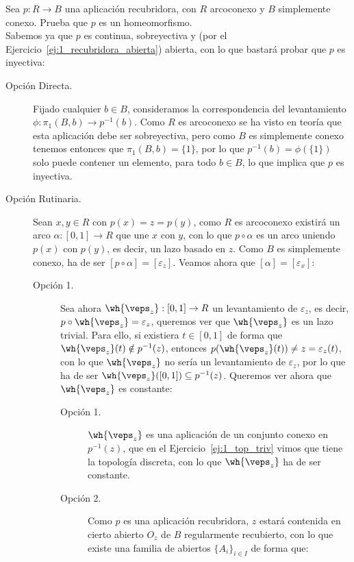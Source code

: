 \begin{ejercicio}\label{ej:10_rel2}
   Sea $p:R\to B$ una aplicación recubridora, con $R$ arcoconexo y $B$ simplemente conexo. Prueba que $p$ es un homeomorfismo.\\

   \noindent
   Sabemos ya que $p$ es continua, sobreyectiva y (por el Ejercicio~\ref{ej:1_recubridora_abierta}) abierta, con lo que bastará probar que $p$ es inyectiva:
   \begin{description}
       \item [Opción Directa.] Fijado cualquier $b\in B$, consideramos la correspondencia del levantamiento $\phi:\pi_1(B,b)\to p^{-1}(b)$. Como $R$ es arcoconexo se ha visto en teoría que esta aplicación debe ser sobreyectiva, pero como $B$ es simplemente conexo tenemos entonces que $\pi_1(B,b) = \{1\}$, por lo que $p^{-1}(b)=\phi(\{1\})$ solo puede contener un elemento, para todo $b\in B$, lo que implica que $p$ es inyectiva.
       \item [Opción Rutinaria.] Sean $x,y\in R$ con $p(x) = z = p(y)$, como $R$ es arcoconexo existirá un arco $\alpha:[0,1]\to R$ que une $x$ con $y$, con lo que $p\circ \alpha$ es un arco uniendo $p(x)$ con $p(y)$, es decir, un lazo basado en $z$. Como $B$ es simplemente conexo, ha de ser $[p\circ \alpha] = [\varepsilon_z]$. Veamos ahora que $[\alpha] = [\varepsilon_x]$:
       \begin{description}
            \item[Opción 1.] Sea ahora $\wh{\veps_z}:[0,1]\to R$ un levantamiento de $\varepsilon_z$, es decir, $p\circ \wh{\veps_z} = \varepsilon_z$, queremos ver que $\wh{\veps_z}$ es un lazo trivial. Para ello, si existiera $t\in [0,1]$ de forma que $\wh{\veps_z}(t)\notin p^{-1}(z)$, entonces $p(\wh{\veps_z}(t)) \neq z = \varepsilon_z(t)$, con lo que $\wh{\veps_z}$ no sería un levantamiento de $\varepsilon_z$, por lo que ha de ser $\wh{\veps_z}([0,1])\subseteq p^{-1}(z)$. Queremos ver ahora que $\wh{\veps_z}$ es constante:
            \begin{description}
                \item [Opción 1.] $\wh{\veps_z}$ es una aplicación de un conjunto conexo en $p^{-1}(z)$, que en el Ejercicio~\ref{ej:1_top_triv} vimos que tiene la topología discreta, con lo que $\wh{\veps_z}$ ha de ser constante.
                \item [Opción 2.] Como $p$ es una aplicación recubridora, $z$ estará contenida en cierto abierto $O_z$ de $B$ regularmente recubierto, con lo que existe una familia de abiertos $\{A_i\}_{i \in I}$ de forma que:

\end{description}
\end{description}
\end{description}
\end{ejercicio}
